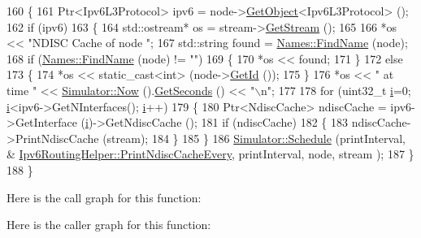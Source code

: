 \begin{DoxyCode}
160 \{
161   Ptr<Ipv6L3Protocol> ipv6 = node->\hyperlink{classns3_1_1Object_a13e18c00017096c8381eb651d5bd0783}{GetObject}<Ipv6L3Protocol> ();
162   \textcolor{keywordflow}{if} (ipv6)
163     \{
164       std::ostream* os = stream->\hyperlink{classns3_1_1OutputStreamWrapper_a0cf30a4188ab6fdae2b2ab74db11acc2}{GetStream} ();
165 
166       *os << \textcolor{stringliteral}{"NDISC Cache of node "};
167       std::string found = \hyperlink{classns3_1_1Names_ab9664faf23569aaae64a2d1f65265045}{Names::FindName} (node);
168       \textcolor{keywordflow}{if} (\hyperlink{classns3_1_1Names_ab9664faf23569aaae64a2d1f65265045}{Names::FindName} (node) != \textcolor{stringliteral}{""})
169         \{
170           *os << found;
171         \}
172       \textcolor{keywordflow}{else}
173         \{
174           *os << static\_cast<int> (node->\hyperlink{classns3_1_1Node_aaf49b64a843565ce3812326313b370ac}{GetId} ());
175         \}
176       *os << \textcolor{stringliteral}{" at time "} << \hyperlink{classns3_1_1Simulator_ac3178fa975b419f7875e7105be122800}{Simulator::Now} ().\hyperlink{classns3_1_1Time_a8f20d5c3b0902d7b4320982f340b57c8}{GetSeconds} () << \textcolor{stringliteral}{"\(\backslash\)n"};
177 
178       \textcolor{keywordflow}{for} (uint32\_t \hyperlink{bernuolliDistribution_8m_a6f6ccfcf58b31cb6412107d9d5281426}{i}=0; \hyperlink{bernuolliDistribution_8m_a6f6ccfcf58b31cb6412107d9d5281426}{i}<ipv6->GetNInterfaces(); \hyperlink{bernuolliDistribution_8m_a6f6ccfcf58b31cb6412107d9d5281426}{i}++)
179         \{
180           Ptr<NdiscCache> ndiscCache = ipv6->GetInterface (\hyperlink{bernuolliDistribution_8m_a6f6ccfcf58b31cb6412107d9d5281426}{i})->GetNdiscCache ();
181           \textcolor{keywordflow}{if} (ndiscCache)
182             \{
183               ndiscCache->PrintNdiscCache (stream);
184             \}
185         \}
186       \hyperlink{classns3_1_1Simulator_a671882c894a08af4a5e91181bf1eec13}{Simulator::Schedule} (printInterval, &
      \hyperlink{classns3_1_1Ipv6RoutingHelper_a6b83234c9aa93f14576ba9f12c87a64b}{Ipv6RoutingHelper::PrintNdiscCacheEvery}, printInterval, node, stream
      );
187     \}
188 \}
\end{DoxyCode}


Here is the call graph for this function\+:




Here is the caller graph for this function\+:


